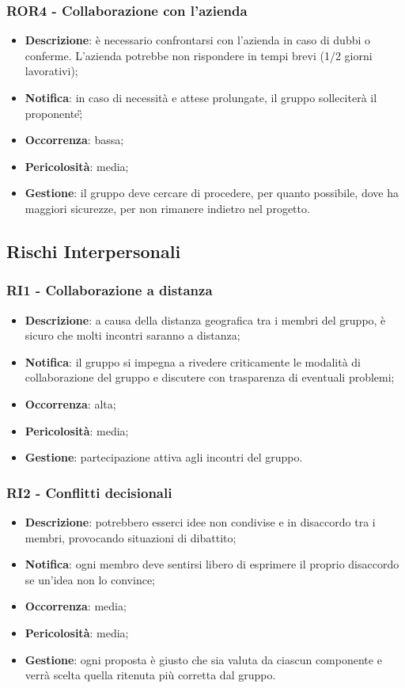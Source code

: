 	\subsubsection*{ROR4 - Collaborazione con l'azienda}
	\begin{itemize}
		\item \textbf{Descrizione}: è necessario confrontarsi con l'azienda in caso di dubbi o conferme. L'azienda potrebbe non rispondere in tempi brevi (1/2 giorni lavorativi);
		\item \textbf{Notifica}: in caso di necessità e attese prolungate, il gruppo solleciterà il proponente\G;
		\item \textbf{Occorrenza}: bassa;
		\item \textbf{Pericolosità}: media;
		\item \textbf{Gestione}: il gruppo deve cercare di procedere, per quanto possibile, dove ha maggiori sicurezze, per non rimanere indietro nel progetto.
	\end{itemize}

   \subsection{Rischi Interpersonali}

	\subsubsection*{RI1 - Collaborazione a distanza}
	\begin{itemize}
		\item \textbf{Descrizione}: a causa della distanza geografica tra i membri del gruppo, è sicuro che molti incontri saranno a distanza;
		\item \textbf{Notifica}: il gruppo si impegna a rivedere criticamente le modalità di collaborazione del gruppo e discutere con trasparenza di eventuali problemi;
		\item \textbf{Occorrenza}: alta;
		\item \textbf{Pericolosità}: media;
		\item \textbf{Gestione}: partecipazione attiva agli incontri del gruppo.
	\end{itemize}

	\subsubsection*{RI2 - Conflitti decisionali}
	\begin{itemize}
		\item \textbf{Descrizione}: potrebbero esserci idee non condivise e in disaccordo tra i membri, provocando situazioni di dibattito;
		\item \textbf{Notifica}: ogni membro deve sentirsi libero di esprimere il proprio disaccordo se un'idea non lo convince;
		\item \textbf{Occorrenza}: media;
		\item \textbf{Pericolosità}: media;
		\item \textbf{Gestione}: ogni proposta è giusto che sia valuta da ciascun componente e verrà scelta quella ritenuta più corretta dal gruppo.
	\end{itemize}

